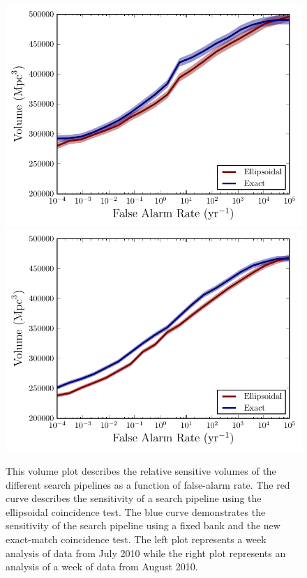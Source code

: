 \documentclass[12pt]{iopart} \usepackage{graphicx,amssymb}
\begin{document}
\begin{figure}[t!bp]	
\begin{center}
\includegraphics[width=0.45\linewidth]{figures/volume_plots/ethinca_exact_match_w1.pdf}
\includegraphics[width=0.45\linewidth]{figures/volume_plots/ethinca_exact_match_w2.pdf}
\caption{This volume plot describes the relative sensitive volumes of the
different search pipelines as a function of false-alarm rate. The red curve
describes the sensitivity of a search pipeline using the ellipsoidal coincidence test.  
The blue curve
demonstrates the sensitivity of the search pipeline using a fixed bank and the
new exact-match coincidence test. The left plot represents a week
analysis of data from July 2010 while the right plot represents an analysis of a week of data
from August 2010.}
\label{fig:coinc}
\end{center}
\end{figure}
\end{document}
